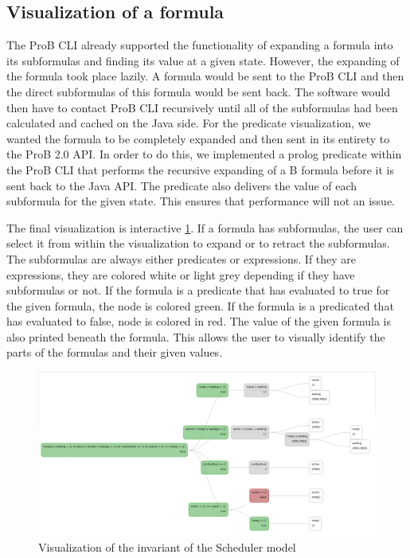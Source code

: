 \subsection{Visualization of a formula}

The ProB CLI already supported the functionality of expanding a formula into its subformulas and finding its value at a given state. However, the expanding of the formula took place lazily. A formula would be sent to the ProB CLI and then the direct subformulas of this formula would be sent back. The software would then have to contact ProB CLI recursively until all of the subformulas had been calculated and cached on the Java side. For the predicate visualization, we wanted the formula to be completely expanded and then sent in its entirety to the ProB 2.0 API. In order to do this, we implemented a prolog predicate within the ProB CLI that performs the recursive expanding of a B formula before it is sent back to the Java API. The predicate also delivers the value of each subformula for the given state. This ensures that performance will not an issue. 

The final visualization is interactive \ref{predicate}. If a formula has subformulas, the user can select it from within the visualization to expand or to retract the subformulas. The subformulas are always either predicates or expressions. If they are expressions, they are colored white or light grey depending if they have subformulas or not. If the formula is a predicate that has evaluated to true for the given formula, the node is colored green. If the formula is a predicated that has evaluated to false, node is colored in red. The value of the given formula is also printed beneath the formula. This allows the user to visually identify the parts of the formulas and their given values. 

\begin{figure}[h!]
\centering
\includegraphics[width=15cm]{bilder/invariant.png}
\caption{Visualization of the invariant of the Scheduler model}
\label{predicate}
\end{figure}

